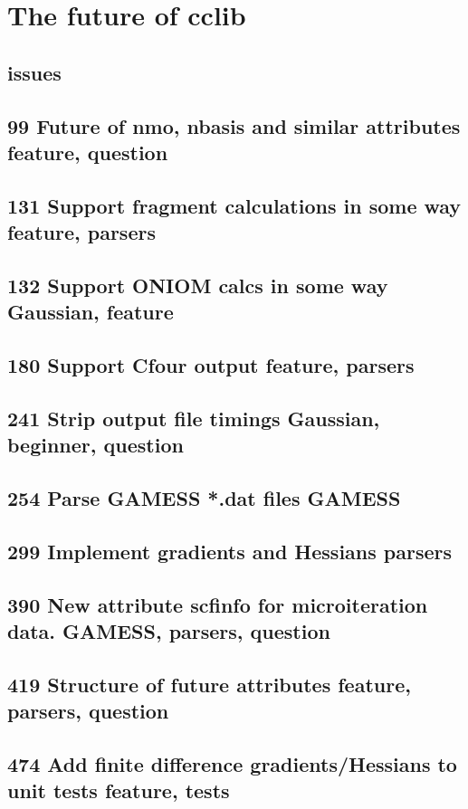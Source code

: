 \section{The future of cclib}
\subsection{issues}
\subsection{99  Future of nmo, nbasis and similar attributes feature, question}
\subsection{131 Support fragment calculations in some way feature, parsers}
\subsection{132 Support ONIOM calcs in some way Gaussian, feature}
\subsection{180 Support Cfour output feature, parsers}
\subsection{241 Strip output file timings Gaussian, beginner, question}
\subsection{254 Parse GAMESS *.dat files GAMESS}
\subsection{299 Implement gradients and Hessians parsers}
\subsection{390 New attribute scfinfo for microiteration data. GAMESS, parsers, question}
\subsection{419 Structure of future attributes feature, parsers, question}
\subsection{474 Add finite difference gradients/Hessians to unit tests feature, tests}
